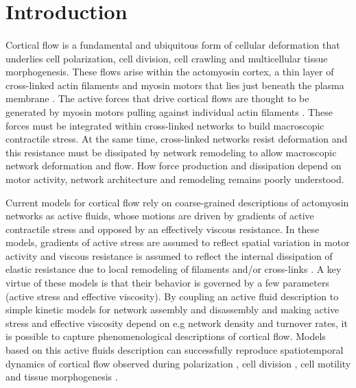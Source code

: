 \documentclass[10pt,letterpaper]{article}
\begin{document}
\section*{Introduction}

\paragraph{}  Cortical flow is a fundamental and ubiquitous form of cellular deformation that underlies cell polarization, cell division, cell crawling and multicellular tissue morphogenesis\cite{cellmech_flows3,cellmech_flows2}.  These flows arise within the actomyosin cortex, a thin layer of cross-linked actin filaments and myosin motors that lies just beneath the plasma membrane \cite{Salbreux2012536}. The active forces that drive cortical flows are thought to be generated by myosin motors pulling against individual actin filaments \cite{Munro2004413}. These forces must be integrated within cross-linked networks to build macroscopic contractile stress.  At the same time, cross-linked networks resist deformation and this resistance must be dissipated by network remodeling to allow macroscopic network deformation and flow.  How force production and dissipation depend on motor activity, network architecture and remodeling remains poorly understood.

Current models for cortical flow rely on coarse-grained descriptions of actomyosin networks as active fluids, whose motions are driven by gradients of active contractile stress and opposed by an effectively viscous resistance\cite{cellmech_flows}.  In these models, gradients of active stress are assumed to reflect spatial variation in motor activity and viscous resistance is assumed to reflect the internal dissipation of elastic resistance due to local remodeling of filaments and/or cross-links \cite{PhysRevLett.106.028103}.  A key virtue of these models is that their behavior is governed by a few parameters (active stress and effective viscosity).  By coupling an active fluid description to simple kinetic models for network assembly and disassembly and making active stress and effective viscosity depend on e.g network density and turnover rates, it is possible to capture phenomenological descriptions of cortical flow.  Models based on this active fluids description can successfully reproduce spatiotemporal dynamics of cortical flow observed during polarization \cite{cellmech_flows}, cell division \cite{Turlier2014114,PhysRevLett.103.058102}, cell motility \cite{Keren:2009aa,RevModPhys.85.1143} and tissue morphogenesis \cite{Heisenberg2013948}.  
\end{document}
